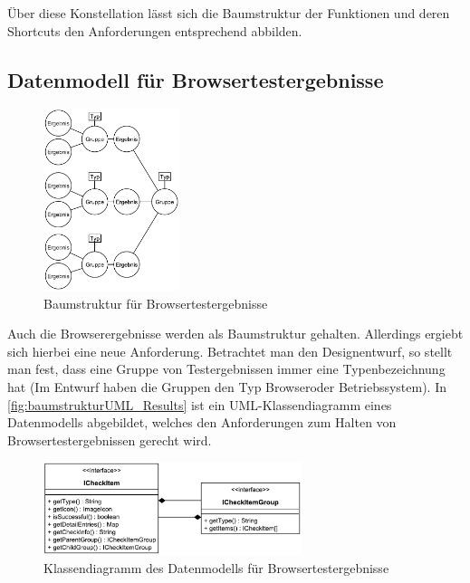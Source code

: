 Über diese Konstellation lässt sich die Baumstruktur der Funktionen und deren Shortcuts den Anforderungen entsprechend abbilden.

\newpage

\subsection{Datenmodell für Browsertestergebnisse}

\begin{figure}
	\includegraphics[width=150px]{../graphic/diagrams/Baumstruktur_Results/Baumstruktur}
	\caption{Baumstruktur für Browsertestergebnisse}
	\label{fig:baumstruktur_Result}
\end{figure}

Auch die Browserergebnisse werden als Baumstruktur gehalten. Allerdings ergiebt sich hierbei eine neue Anforderung. Betrachtet man den Designentwurf, so stellt man fest, dass eine Gruppe von Testergebnissen immer eine Typenbezeichnung hat (Im Entwurf haben die Gruppen den Typ \glqq Browser\grqq oder \glqq Betriebssystem\grqq). In \autoref{fig:baumstrukturUML_Results} ist ein UML-Klassendiagramm eines Datenmodells abgebildet, welches den Anforderungen zum Halten von Browsertestergebnissen gerecht wird.

\begin{figure}[H]
	\flushright
	\includegraphics[width=285px]{../graphic/diagrams/CD_Baumstruktur_Results/Baumstruktur}
	\captionsetup{width=235px, justification=raggedleft}
	\caption{Klassendiagramm des Datenmodells für Browsertestergebnisse}
	\label{fig:baumstrukturUML_Results}
\end{figure}

